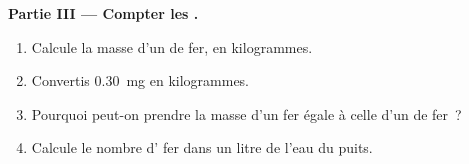 \begin{problem}
\medskip
\noindent\textbf{Partie III --- Compter les .}
\begin{enumerate}[resume]
  \item Calcule la masse d'un  de fer, en kilogrammes.
  \item Convertis \qty{0.30}{mg} en kilogrammes.
  \item Pourquoi peut-on prendre la masse d'un  fer égale à celle d'un
         de fer~?
  \item Calcule le nombre d' fer dans un litre de l'eau du puits.
\end{enumerate}
\end{problem}
